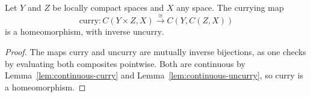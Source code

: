 \begin{theorem}
    \label{thm:curry-homeo}
    \leanok
    Let $Y$ and $Z$ be locally compact spaces and $X$ any space. The currying
    map
    \[
        \mathrm{curry} : C(Y \times Z, X) \xrightarrow{\ \cong\ } C(Y, C(Z, X))
    \]
    is a homeomorphism, with inverse $\mathrm{uncurry}$.
\end{theorem}
\begin{proof}
    The maps $\mathrm{curry}$ and $\mathrm{uncurry}$ are mutually inverse
    bijections, as one checks by evaluating both composites pointwise. Both are
    continuous by Lemma~\ref{lem:continuous-curry} and
    Lemma~\ref{lem:continuous-uncurry}, so $\mathrm{curry}$ is a homeomorphism.
\end{proof}


